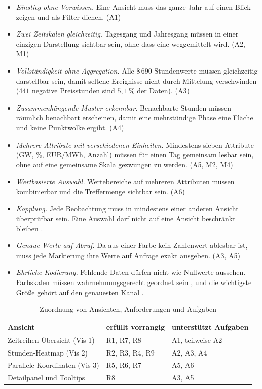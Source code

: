 \begin{itemize}
  \item[\textbf{R1}] \emph{Einstieg ohne Vorwissen.} Eine Ansicht muss das ganze Jahr auf einen
        Blick zeigen und als Filter dienen. (A1)
  \item[\textbf{R2}] \emph{Zwei Zeitskalen gleichzeitig.} Tagesgang und Jahresgang müssen in einer
        einzigen Darstellung sichtbar sein, ohne dass eine weggemittelt wird. (A2, M1)
  \item[\textbf{R3}] \emph{Vollständigkeit ohne Aggregation.} Alle $8\,690$ Stundenwerte müssen
        gleichzeitig darstellbar sein, damit seltene Ereignisse nicht durch Mittelung verschwinden
        ($441$ negative Preisstunden sind $5{,}1\,\%$ der Daten). (A3)
  \item[\textbf{R4}] \emph{Zusammenhängende Muster erkennbar.} Benachbarte Stunden müssen räumlich
        benachbart erscheinen, damit eine mehrstündige Phase eine Fläche und keine Punktwolke
        ergibt. (A4)
  \item[\textbf{R5}] \emph{Mehrere Attribute mit verschiedenen Einheiten.} Mindestens sieben
        Attribute (GW, \%, EUR/MWh, Anzahl) müssen für einen Tag gemeinsam lesbar sein, ohne auf
        eine gemeinsame Skala gezwungen zu werden. (A5, M2, M4)
  \item[\textbf{R6}] \emph{Wertbasierte Auswahl.} Wertebereiche auf mehreren Attributen müssen
        kombinierbar und die Treffermenge sichtbar sein. (A6)
  \item[\textbf{R7}] \emph{Kopplung.} Jede Beobachtung muss in mindestens einer anderen Ansicht
        überprüfbar sein. Eine Auswahl darf nicht auf eine Ansicht beschränkt bleiben
        \cite{Roberts2007}.
  \item[\textbf{R8}] \emph{Genaue Werte auf Abruf.} Da aus einer Farbe kein Zahlenwert ablesbar
        ist, muss jede Markierung ihre Werte auf Anfrage exakt ausgeben. (A3, A5)
  \item[\textbf{R9}] \emph{Ehrliche Kodierung.} Fehlende Daten dürfen nicht wie Nullwerte
        aussehen. Farbskalen müssen wahrnehmungsgerecht geordnet sein
        \cite{Borland2007,Harrower2003}, und die wichtigste Größe gehört auf den genauesten Kanal
        \cite{Ware2012,Munzner2014}.
\end{itemize}

\begin{table}[H]
\centering\small
\caption{Zuordnung von Ansichten, Anforderungen und Aufgaben}\label{tab:anforderungen}
\begin{tabular}{lll}
\toprule
Ansicht & erfüllt vorrangig & unterstützt Aufgaben \\
\midrule
Zeitreihen-Übersicht (Vis 1) & R1, R7, R8 & A1, teilweise A2 \\
Stunden-Heatmap (Vis 2) & R2, R3, R4, R9 & A2, A3, A4 \\
Parallele Koordinaten (Vis 3) & R5, R6, R7 & A5, A6 \\
Detailpanel und Tooltips & R8 & A3, A5 \\
\bottomrule
\end{tabular}
\end{table}

